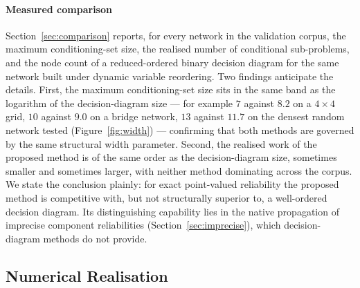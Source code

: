 \documentclass[preprint,12pt]{elsarticle}
\theoremstyle{definition}
\begin{document}
\paragraph{Measured comparison}
Section~\ref{sec:comparison} reports, for every network in the validation corpus, the maximum
conditioning-set size, the realised number of conditional sub-problems, and the node count of a
reduced-ordered binary decision diagram for the same network built under dynamic variable reordering.
Two findings anticipate the details. First, the maximum conditioning-set size sits in the same band as
the logarithm of the decision-diagram size --- for example $7$ against $8.2$ on a $4{\times}4$ grid,
$10$ against $9.0$ on a bridge network, $13$ against $11.7$ on the densest random network tested
(Figure~\ref{fig:width}) --- confirming that both methods are governed by the same structural width
parameter. Second, the realised work of the proposed method is of the same order as the decision-diagram
size, sometimes smaller and sometimes larger, with neither method dominating across the corpus. We state
the conclusion plainly: for exact point-valued reliability the proposed method is competitive with, but
not structurally superior to, a well-ordered decision diagram. Its distinguishing capability lies in the
native propagation of imprecise component reliabilities (Section~\ref{sec:imprecise}), which
decision-diagram methods do not provide.

\subsection{Numerical Realisation}\label{sec:numerical}
\end{document}
